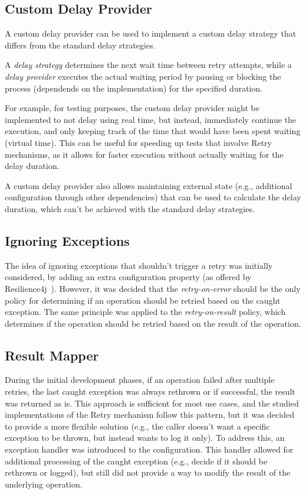\subsection{Custom Delay Provider}\label{subsec:retry-custom-delay-provider}

A custom delay provider can be used
to implement a custom delay strategy that differs from the standard delay strategies.

A \textit{delay strategy} determines the next wait time between retry attempts,
while a \textit{delay provider} executes the actual waiting period by pausing or blocking the process
(dependends on the implementation) for the specified duration.

For example, for testing purposes, the custom delay provider might be implemented to not delay using real time,
but instead, immediately continue the execution,
and only keeping track of the time that would have been spent waiting (virtual time).
This can be useful for speeding up tests that involve Retry mechanisms,
as it allows for faster execution without actually waiting for the delay duration.

A custom delay provider also allows maintaining external state
(e.g., additional configuration through other dependencies) that can be used to calculate the delay duration,
which can't be achieved with the standard delay strategies.

\subsection{Ignoring Exceptions}\label{subsec:retry-ignoring-exceptions}

The idea of ignoring exceptions that shouldn’t trigger a retry was initially considered,
by adding an extra configuration property (as offered by Resilience4j~\cite{resilience4j-retry}).
However,
it was decided
that the \textit{retry-on-error} should be the only policy
for determining if an operation should be retried based on the caught exception.
The same principle was applied to the \textit{retry-on-result} policy, which determines if the operation should be retried based on the result of the operation.

\subsection{Result Mapper}\label{subsec:retry-result-mapper}

During the initial development phases, if an operation failed after multiple retries,
the last caught exception was always rethrown or if successful, the result was returned as is.
This approach is sufficient for most use cases,
and the studied implementations of the Retry mechanism follow this pattern, but
it was decided to provide a more flexible solution
(e.g., the caller doesn't want a specific exception to be thrown, but instead wants to log it only).
To address this, an exception handler was introduced to the configuration.
This handler allowed for additional processing of the caught exception
(e.g., decide if it should be rethrown or logged),
but still did not provide a way to modify the result of the underlying operation.

